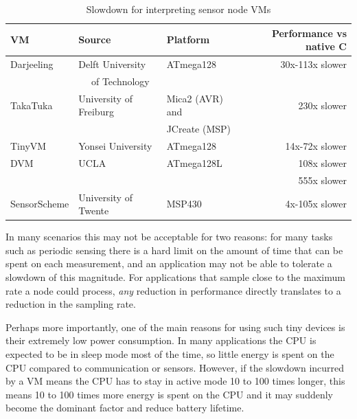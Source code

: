 \begin{table}
\caption{Slowdown for interpreting sensor node VMs}
\label{tbl-slowdown-for-sensornode-vms}
    \begin{tabular}{lllr} %
    \toprule
    VM              & Source                           & Platform                   & Performance vs native C \\
    \midrule
    \midrule
    Darjeeling      & Delft University                 & ATmega128                  & 30x-113x slower \cite{Brouwers:2009cj} \\
                    & ~~ of Technology                 &                            & \\
    TakaTuka        & University of Freiburg           & Mica2 (AVR) and            & 230x slower \cite{Ellul:2012thesis} \\
                    &                                  & JCreate (MSP)                           & \\
    TinyVM          & Yonsei University                & ATmega128                  & 14x-72x slower \cite{Hong:2012wj} \\
    DVM             & UCLA                             & ATmega128L                 & 108x slower \cite{Balani:2006} \\
                    &                                  &                            & 555x slower \cite{Kumar:2007ge} \\
    SensorScheme    & University of Twente             & MSP430                     & 4x-105x slower \cite{Evers:2010ur} \\
    \bottomrule
    \end{tabular}
\end{table}

In many scenarios this may not be acceptable for two reasons: for many tasks such as periodic sensing there is a hard limit on the amount of time that can be spent on each measurement, and an application may not be able to tolerate a slowdown of this magnitude. For applications that sample close to the maximum rate a node could process, \emph{any} reduction in performance directly translates to a reduction in the sampling rate.

Perhaps more importantly, one of the main reasons for using such tiny devices is their extremely low power consumption. In many applications the CPU is expected to be in sleep mode most of the time, so little energy is spent on the CPU compared to communication or sensors. However, if the slowdown incurred by a VM means the CPU has to stay in active mode 10 to 100 times longer, this means 10 to 100 times more energy is spent on the CPU and it may suddenly become the dominant factor and reduce battery lifetime.

